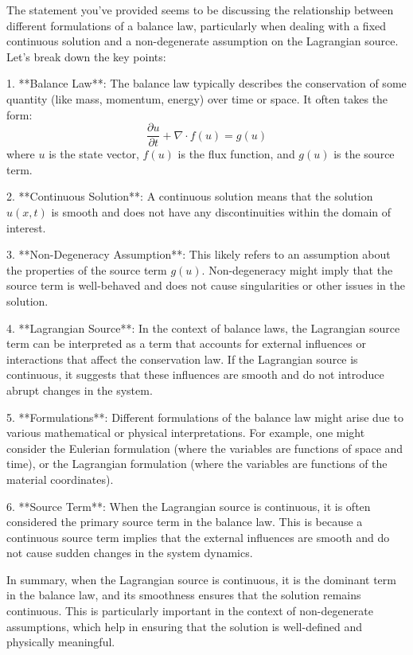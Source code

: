 The statement you've provided seems to be discussing the relationship between different formulations of a balance law, particularly when dealing with a fixed continuous solution and a non-degenerate assumption on the Lagrangian source. Let's break down the key points:

1. **Balance Law**: The balance law typically describes the conservation of some quantity (like mass, momentum, energy) over time or space. It often takes the form:
   \[
   \frac{\partial u}{\partial t} + \nabla \cdot f(u) = g(u)
   \]
   where \(u\) is the state vector, \(f(u)\) is the flux function, and \(g(u)\) is the source term.

2. **Continuous Solution**: A continuous solution means that the solution \(u(x,t)\) is smooth and does not have any discontinuities within the domain of interest.

3. **Non-Degeneracy Assumption**: This likely refers to an assumption about the properties of the source term \(g(u)\). Non-degeneracy might imply that the source term is well-behaved and does not cause singularities or other issues in the solution.

4. **Lagrangian Source**: In the context of balance laws, the Lagrangian source term can be interpreted as a term that accounts for external influences or interactions that affect the conservation law. If the Lagrangian source is continuous, it suggests that these influences are smooth and do not introduce abrupt changes in the system.

5. **Formulations**: Different formulations of the balance law might arise due to various mathematical or physical interpretations. For example, one might consider the Eulerian formulation (where the variables are functions of space and time), or the Lagrangian formulation (where the variables are functions of the material coordinates).

6. **Source Term**: When the Lagrangian source is continuous, it is often considered the primary source term in the balance law. This is because a continuous source term implies that the external influences are smooth and do not cause sudden changes in the system dynamics.

In summary, when the Lagrangian source is continuous, it is the dominant term in the balance law, and its smoothness ensures that the solution remains continuous. This is particularly important in the context of non-degenerate assumptions, which help in ensuring that the solution is well-defined and physically meaningful.